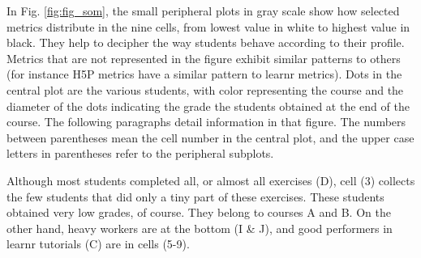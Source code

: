 \documentclass{aims}
\theoremstyle{definition}
\begin{document}
In Fig. \ref {fig:fig_som}, the small peripheral plots in gray scale
show how selected metrics distribute in the nine cells, from lowest
value in white to highest value in black. They help to decipher the way
students behave according to their profile. Metrics that are not
represented in the figure exhibit similar patterns to others (for
instance H5P metrics have a similar pattern to learnr metrics). Dots in
the central plot are the various students, with color representing the
course and the diameter of the dots indicating the grade the students
obtained at the end of the course. The following paragraphs detail
information in that figure. The numbers between parentheses mean the
cell number in the central plot, and the upper case letters in
parentheses refer to the peripheral subplots.

Although most students completed all, or almost all exercises (D), cell
(3) collects the few students that did only a tiny part of these
exercises. These students obtained very low grades, of course. They
belong to courses A and B. On the other hand, heavy workers are at the
bottom (I \& J), and good performers in learnr tutorials (C) are in
cells (5-9).
\end{document}
